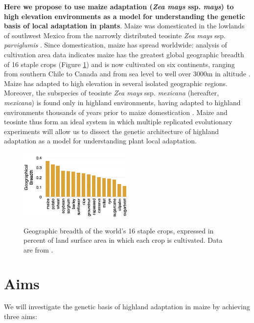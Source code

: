 {\bf Here we propose to use maize adaptation (\emph{Zea mays} ssp. \emph{mays}) to high elevation environments as a model for understanding the genetic basis of local adaptation in plants}.  Maize was domesticated in the lowlands of southwest Mexico from the narrowly distributed teosinte \emph{Zea mays} ssp. \emph{parviglumis} \citep[hereafter, \emph{parviglumis};][]{Matsuoka2002}. Since domestication, maize has spread worldwide: analysis of cultivation area data indicates maize has the greatest global geographic breadth of 16 staple crops (Figure \ref{fig:breadth}) and is now cultivated on six continents, ranging from southern Chile to Canada and from sea level to well over 3000m in altitude \citep{tenaillon2011european}. Maize has adapted to high elevation in several isolated geographic regions.  Moreover, the subspecies of teosinte \emph{Zea mays} ssp. \emph{mexicana} (hereafter, \emph{mexicana}) is found only in highland environments, having adapted to highland environments thousands of years prior to maize domestication \citep{Ross-Ibarra2009a, hufford2012inferences}. Maize and teosinte thus form an ideal system in which multiple replicated evolutionary experiments will allow us to dissect the genetic architecture of highland adaptation as a model for understanding plant local adaptation.

\begin{figure}
  \centering
  \caption{Geographic breadth of the world's 16 staple crops, expressed in percent of land surface area in which each crop is cultivated. Data are from \citet{monfreda2008farming}. } 
   \includegraphics[width=0.5\textwidth]{breadth.png}
\label{fig:breadth}
\end{figure}

\section*{Aims}

We will investigate the genetic basis of highland adaptation in maize by achieving three aims:

